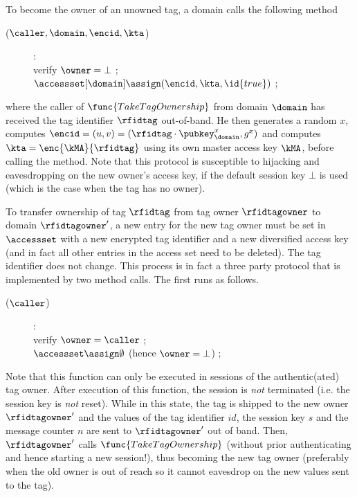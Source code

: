 To become the owner of an unowned tag, a domain calls the following method
\begin{description}
\item[($\caller,\domain,\encid,\kta$)]:\\
	verify $\owner = \bot$ ; \\
	$\accessset[\domain] \assign (\encid,\kta, \id{true})$ ; \\
\end{description}
where the caller of $\func{TakeTagOwnership}$ from domain $\domain$ 
has received the tag identifier $\rfidtag$ out-of-band. 
He then generates a random $x$, computes
$\encid = (u,v) = (\rfidtag \cdot \pubkey_{\domain}^x,g^x)$
and computes
$\kta = \enc{\kMA}{\rfidtag}$ using its own master access key $\kMA$, before
calling the method.
Note that this protocol is susceptible to hijacking and eavesdropping on the new owner's access
key, if the default session key $\bot$ is used (which is the case when the tag
has no owner). 

To transfer ownership of tag $\rfidtag$ from tag owner $\rfidtagowner$ to
domain $\rfidtagowner'$, a new entry for the new tag owner must be set in
$\accessset$ with a new encrypted tag identifier and a new diversified access
key (and in fact all other entries in the access set need to be deleted). 
The tag identifier does not change. This process is in fact a three party
protocol that is implemented by two method calls. The first runs as follows.
\begin{description}
\item[($\caller$)]:\\
	verify $\owner = \caller$ ; \\
	$\accessset \assign \emptyset$ (hence $\owner = \bot$) ; 
\end{description}
Note that this function can only be executed in sessions of the authentic(ated) tag owner. 
After execution of this function, the session is \emph{not} terminated 
(i.e. the session key is \emph{not} reset). While in this state, the tag is 
shipped to the new owner $\rfidtagowner'$ and the values of the tag identifier $id$, 
the session key $s$ and the message counter $n$ are sent to $\rfidtagowner'$ out of band.
Then, $\rfidtagowner'$ calls $\func{TakeTagOwnership}$
(without prior authenticating and hence starting a new session!), 
thus becoming the new tag owner
(preferably when the old owner is out of reach so it cannot eavesdrop 
on the new values sent to the tag).

